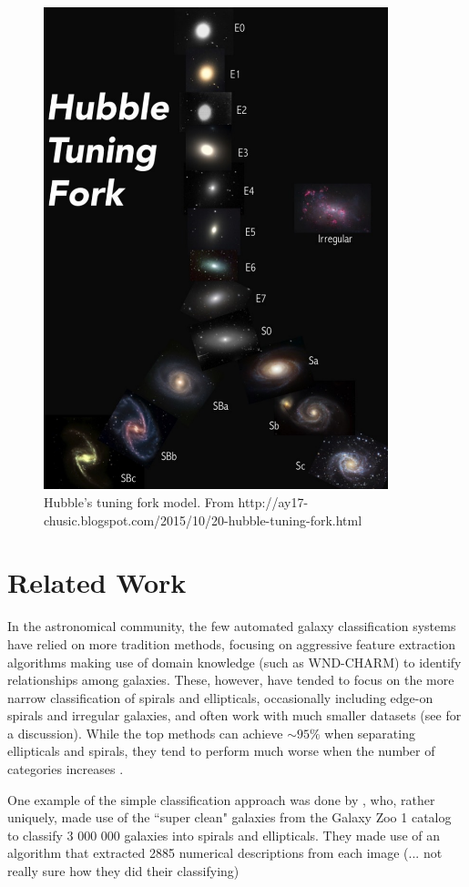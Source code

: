 \documentclass{article}
\begin{document}
\begin{figure}[h]
  \centering
	\includegraphics[width=100mm]{../img/tuningFork.pdf}
  \caption{Hubble's tuning fork model. From http://ay17-chusic.blogspot.com/2015/10/20-hubble-tuning-fork.html}
  \label{fig:tuningFork}
\end{figure}


\section{Related Work}
\label{gen_inst}
In the astronomical community, the few automated galaxy classification systems have relied on more tradition methods, focusing on aggressive feature extraction algorithms making use of domain knowledge (such as WND-CHARM) to identify relationships among galaxies. These, however, have tended to focus on the more narrow classification of spirals and ellipticals, occasionally including edge-on spirals and irregular galaxies, and often work with much smaller datasets (see \citealt{2015MNRAS.450.1441D} for a discussion). While the top methods can achieve $\sim95\%$ when separating ellipticals and spirals, they tend to perform much worse when the number of categories increases \citep{2004MNRAS.349...87D}.

One example of the simple classification approach was done by \cite{2016ApJS..223...20K}, who, rather uniquely, made use of the ``super clean" galaxies from the Galaxy Zoo 1 catalog \citep{2008MNRAS.389.1179L} to classify 3 000 000 galaxies into spirals and ellipticals. They made use of an algorithm that extracted 2885 numerical descriptions from each image (... not really sure how they did their classifying)
\end{document}
